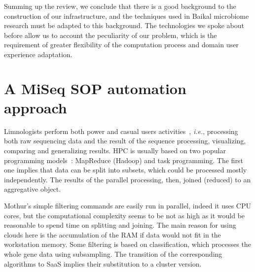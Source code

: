 \documentclass[a4paper]{jpconf}
\begin{document}
Summing up the review, we conclude that there is a good background to the construction of our infrastructure, and the techniques used in Baikal microbiome research must be adapted to this background. The technologies we spoke about before allow us to account the peculiarity of our problem, which is the requirement of greater flexibility of the computation process and domain user experience adaptation.






\section{A MiSeq SOP automation approach}\label{sec:proc-mod}

Limnologists perform both power and casual users activities~\cite{guo16}, \emph{i.e.}, processing both raw sequencing data and the result of the sequence processing, visualizing, comparing and generalizing results. HPC is usually based on two popular programming models~\cite{guo16}: MapReduce (Hadoop) and task programming. The first one implies that data can be split into subsets, which could be processed mostly independently. The results of the parallel processing, then, joined (reduced) to an aggregative object.

Mothur's simple filtering commands are easily run in parallel, indeed it uses CPU cores, but the computational complexity seems to be not as high as it would be reasonable to spend time on splitting and joining.  The main reason for using clouds here is the accumulation of the RAM if data would not fit in the workstation memory. %
Some filtering is based on classification, which processes the whole gene data using subsampling.  The transition of the corresponding algorithms to SaaS implies their substitution to a cluster version.
\end{document}
